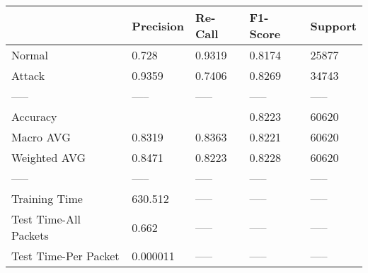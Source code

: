 \begin{tabular}{lllll}
\toprule
{} & Precision & Re-Call & F1-Score & Support \\
\midrule
Normal                &     0.728 &  0.9319 &   0.8174 &   25877 \\
Attack                &    0.9359 &  0.7406 &   0.8269 &   34743 \\
-----                 &     ----- &   ----- &    ----- &   ----- \\
Accuracy              &           &         &   0.8223 &   60620 \\
Macro AVG             &    0.8319 &  0.8363 &   0.8221 &   60620 \\
Weighted AVG          &    0.8471 &  0.8223 &   0.8228 &   60620 \\
-----                 &     ----- &   ----- &    ----- &   ----- \\
Training Time         &   630.512 &   ----- &    ----- &   ----- \\
Test Time-All Packets &     0.662 &   ----- &    ----- &   ----- \\
Test Time-Per Packet  &  0.000011 &   ----- &    ----- &   ----- \\
\bottomrule
\end{tabular}
